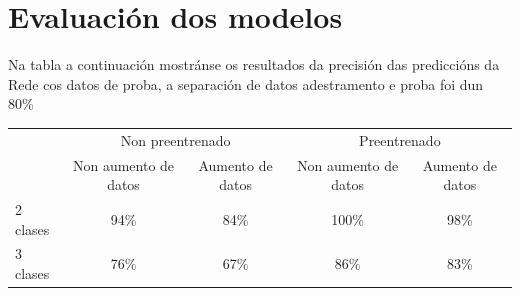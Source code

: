 \documentclass{article}
\begin{document}
\newpage
\section{Evaluación dos modelos}

Na tabla a continuación mostránse os resultados da precisión das prediccións da Rede cos datos de proba, a separación de datos adestramento e proba foi dun 80\%

\begin{table}[H]
\begin{tabular}{l|cc|cc|}
\cline{2-5}
                               & \multicolumn{2}{c|}{Non preentrenado}                        & \multicolumn{2}{c|}{Preentrenado}                            \\ \cline{2-5} 
                               & \multicolumn{1}{c|}{Non aumento de datos} & Aumento de datos & \multicolumn{1}{c|}{Non aumento de datos} & Aumento de datos \\ \hline
\multicolumn{1}{|l|}{2 clases} & \multicolumn{1}{c|}{94\%}                 & 84\%             & \multicolumn{1}{c|}{100\%}                & 98\%             \\ \hline
\multicolumn{1}{|l|}{3 clases} & \multicolumn{1}{c|}{76\%}                 & 67\%             & \multicolumn{1}{c|}{86\%}                 & 83\%             \\ \hline
\end{tabular}
\end{table}
\end{document}
